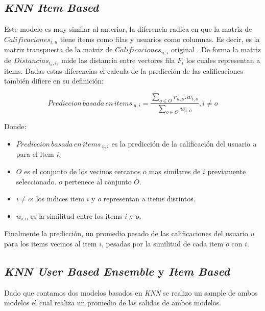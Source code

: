 \documentclass[11pt,a4paper,twoside]{thesis}
\begin{document}
\subsection{\textit{KNN Item Based}}

Este modelo es muy similar al anterior, la diferencia radica en que la matriz de $Calificaciones_{i, u}$ 
tiene items como filas y usuarios como columnas. Es decir, es la matriz transpuesta de la matriz de 
$Calificaciones_{u, i}$ original \cite{useritembasedinference}. De forma la matriz de $Distancias_{i_a,i_b}$ mide las distancia entre vectores fila $F_i$ los cuales representan a items. Dadas estas diferencias el calcula de la predicción de las calificaciones también difiere en su definición:


\begin{equation}
	Prediccion \mspace{3mu}basada \mspace{3mu}en \mspace{3mu}items\mspace{3mu}_{u, i} = \frac{\sum_{o \in O} r_{u, o}. w_{i, o} }{\sum_{o \in O} w_{i, o} }, i \neq o
\end{equation}
\begin{description}
	\item[Donde:]
\end{description}
\begin{itemize}
	\item $Prediccion \mspace{3mu}basada \mspace{3mu}en \mspace{3mu}items\mspace{3mu}_{u, i}$ es la predicción de la calificación del usuario $u$ para el item $i$.
	\item $O$ es el conjunto de los vecinos cercanos o mas similares de $i$ previamente seleccionado. $o$ pertenece al conjunto $O$.
	\item $i \neq o$: los indices item $i$ y $o$ representan a items distintos. 
	\item $w_{i,o}$ es la similitud entre los items $i$ y $o$.
\end{itemize}

Finalmente la predicción, un promedio pesado de las calificaciones del usuario $u$ para los items vecinos al item $i$, pesadas por la similitud de cada item $o$ con $i$.

\subsection{\textit{KNN User Based Ensemble} y \textit{Item Based}}

Dado que contamos dos modelos basados en \textit{KNN} se realizo un sample de ambos modelos el cual realiza un promedio de las salidas de ambos modelos.
\end{document}
